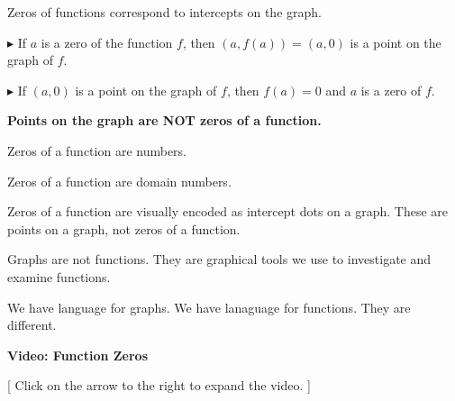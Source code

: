 \documentclass{ximera}
\begin{document}
Zeros of functions correspond to intercepts on the graph.



$\blacktriangleright$ If $a$ is a zero of the function $f$, then $(a, f(a)) = (a, 0)$ is a point on the graph of $f$. 


$\blacktriangleright$ If $(a, 0)$ is a point on the graph of $f$, then $f(a) = 0$ and $a$ is a zero of $f$.





\begin{warning}

\begin{center}

\textbf{\textcolor{red!70!black}{Points on the graph are NOT zeros of a function.}}

\end{center}


Zeros of a function are numbers. 

Zeros of a function are domain numbers. 

Zeros of a function are visually encoded as intercept dots on a graph.  These are points on a graph, not zeros of a function. 


Graphs are not functions.  They are graphical tools we use to investigate and examine functions. 


We have language for graphs.  We have lanaguage for functions.  They are different.


\end{warning}







\begin{explanation} \textbf{\textcolor{red!75!green}{Video: Function Zeros}}

[ Click on the arrow to the right to expand the video. ]
\begin{expandable} 

\begin{center}
\end{center}

\end{expandable}
\end{explanation}
\end{document}

